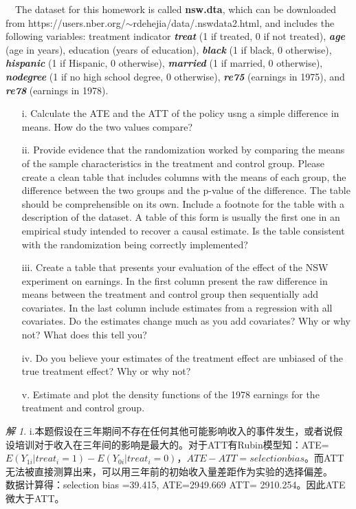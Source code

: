 \documentclass[a4paper]{ctexart}
\theoremstyle{remark}
\newtheorem*{solution}{解}
\begin{document}
\begin{itemize}
~~The dataset for this homework is called \textbf{nsw.dta}, which can be downloaded from https://users.nber.org/$\sim$rdehejia/data/.nswdata2.html,  and includes the following variables: treatment indicator \textit{\textbf{treat}} (1 if treated, 0 if not treated), \textit{\textbf{age}} (age in years), education (years of education), \textit{\textbf{black}} (1 if black, 0 otherwise), \textit{\textbf{hispanic}} (1 if Hispanic, 0 otherwise), \textit{\textbf{married}} (1 if married, 0 otherwise), \textit{\textbf{nodegree}} (1 if no high school degree, 0 otherwise), \textit{\textbf{re75}} (earnings in 1975), and \textit{\textbf{re78}} (earnings in 1978). 

\begin{enumerate}
\item[i.] Calculate the ATE and the ATT of the policy usng a simple difference in means. How do the two values compare?
\item[ii.] Provide evidence that the randomization worked by comparing the means of the sample characteristics in the treatment and control group. Please create a clean table that includes columns with the means of each group, the difference between the two groups and the p-value of the difference. The table should be comprehensible on its own. Include a footnote for the table with a description of the dataset. A table of this form is usually the first one in an empirical study intended to recover a causal estimate. Is the table consistent with the randomization being correctly implemented?
\item[iii.]  Create a table that presents your evaluation of the effect of the NSW experiment on earnings. In the first column present the raw difference in means between the treatment and control group then sequentially add covariates. In the last column include estimates from a regression with all covariates. Do the estimates change much as you add covariates? Why or why not? What does this tell you?
\item[iv.]  Do you believe your estimates of the treatment effect are unbiased of the true treatment effect? Why or why not?
\item[v.]  Estimate and plot the density functions of the 1978 earnings for the treatment and control group.
\end{enumerate}

\begin{solution}
    i.本题假设在三年期间不存在任何其他可能影响收入的事件发生，或者说假设培训对于收入在三年间的影响是最大的。对于ATT有Rubin模型知：ATE=$E(Y_{1i}|treat_i=1)-E(Y_{0i}|treat_i=0)，ATE -ATT = selection bias$。而ATT无法被直接测算出来，可以用三年前的初始收入量差距作为实验的选择偏差。\\
    数据计算得：selection bias =39.415, ATE=2949.669  ATT= 2910.254。因此ATE微大于ATT。\\


\end{solution}
\end{itemize}
\end{document}
